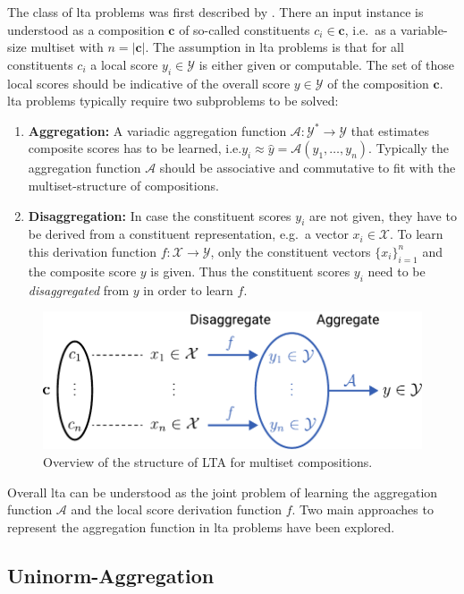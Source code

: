 The class of \ac{lta} problems was first described by \citet{Melnikov2016}.
There an input instance is understood as a composition $\bm{c}$ of so-called constituents $c_i \in \bm{c}$, i.e.\ as a variable-size multiset with $n = |\bm{c}|$.
The assumption in \ac{lta} problems is that for all constituents $c_i$ a local score $y_i \in \mathcal{Y}$ is either given or computable.
The set of those local scores should be indicative of the overall score $y \in \mathcal{Y}$ of the composition $\bm{c}$.
\ac{lta} problems typically require two subproblems to be solved:
\begin{enumerate}[label=\textbf{\arabic*.}]
	\item \textbf{Aggregation:}
		A variadic aggregation function $\mathcal{A}: \mathcal{Y}^{*} \to \mathcal{Y}$ that estimates composite scores has to be learned, i.e.\@ $y_i \approx \hat{y} = \mathcal{A}(y_{1}, \dots, y_{n})$.
		Typically the aggregation function $\mathcal{A}$ should be associative and commutative to fit with the multiset-structure of compositions.
	\item \textbf{Disaggregation:}
		In case the constituent scores $y_i$ are not given, they have to be derived from a constituent representation, e.g.\ a vector $x_i \in \mathcal{X}$.
		To learn this derivation function $f: \mathcal{X} \to \mathcal{Y}$, only the constituent vectors ${\{x_i\}}_{i = 1}^{n}$ and the composite score $y$ is given.
		Thus the constituent scores $y_i$ need to be \textit{disaggregated} from $y$ in order to learn $f$.
\end{enumerate}
\begin{figure}
	\centering
	\includegraphics[width=0.7\linewidth]{gfx/related-work/lta-overview.pdf}
	\caption{Overview of the structure of LTA for multiset compositions.}\label{fig:related:lta-overview}
\end{figure}
Overall \ac{lta} can be understood as the joint problem of learning the aggregation function $\mathcal{A}$ and the local score derivation function $f$.
Two main approaches to represent the aggregation function in \ac{lta} problems have been explored.

\subsection{Uninorm-Aggregation}%
\label{sec:related:lta:uninorm}

